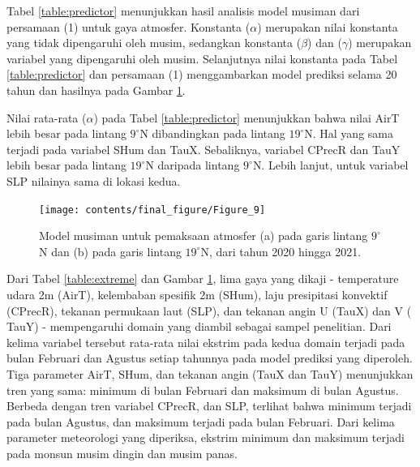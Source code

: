 \begin{spacing}{1.5}
		Tabel \ref{table:predictor} menunjukkan hasil analisis model musiman dari persamaan (1) untuk gaya atmosfer. Konstanta ($\alpha$) merupakan nilai konstanta yang tidak dipengaruhi oleh musim, sedangkan konstanta ($\beta$) dan ($\gamma$) merupakan variabel yang dipengaruhi oleh musim. Selanjutnya nilai konstanta pada Tabel \ref{table:predictor} dan persamaan (1) menggambarkan model prediksi selama 20 tahun dan hasilnya pada Gambar \ref{fig:SM}.
		
		Nilai rata-rata ($\alpha$) pada Tabel \ref{table:predictor} menunjukkan bahwa nilai AirT lebih besar pada lintang $9^\circ$N dibandingkan pada lintang $19^\circ$N. Hal yang sama terjadi pada variabel SHum dan TauX. Sebaliknya, variabel CPrecR dan TauY lebih besar pada lintang $19^\circ$N daripada lintang $9^\circ$N. Lebih lanjut, untuk variabel SLP nilainya sama di lokasi kedua.
		
		\begin{figure}[H]
			\centering
			\texttt{[image: contents/final\_figure/Figure\_9]}
			\caption{Model musiman untuk pemaksaan atmosfer (a) pada garis lintang $9^\circ$N dan (b) pada garis lintang $19^\circ$N, dari tahun 2020 hingga 2021.}
			\label{fig:SM}
		\end{figure}
	
		Dari Tabel \ref{table:extreme} dan Gambar \ref{fig:SM}, lima gaya yang dikaji - temperature udara 2m (AirT), kelembaban spesifik 2m (SHum), laju presipitasi konvektif (CPrecR), tekanan permukaan laut (SLP), dan tekanan angin U (TauX) dan V ( TauY) - mempengaruhi domain yang diambil sebagai sampel penelitian. Dari kelima variabel tersebut rata-rata nilai ekstrim pada kedua domain terjadi pada bulan Februari dan Agustus setiap tahunnya pada model prediksi yang diperoleh. Tiga parameter AirT, SHum, dan tekanan angin (TauX dan TauY) menunjukkan tren yang sama: minimum di bulan Februari dan maksimum di bulan Agustus. Berbeda dengan tren variabel CPrecR, dan SLP, terlihat bahwa minimum terjadi pada bulan Agustus, dan maksimum terjadi pada bulan Februari. Dari kelima parameter meteorologi yang diperiksa, ekstrim minimum dan maksimum terjadi pada monsun musim dingin dan musim panas.
		

\end{spacing}

